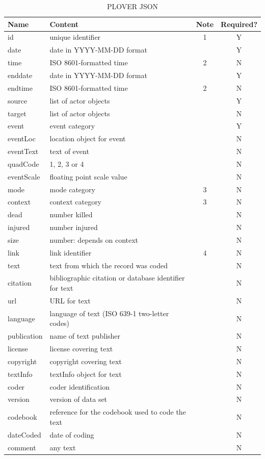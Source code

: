 \documentclass[11pt]{report}
\begin{document}
\begin{table}[htp]
\caption{PLOVER JSON }
\begin{center}
\begin{tabular}{|l|l|c|c|}
\hline
Name & Content & Note & Required? \\
\hline
id & unique identifier & 1 & Y\\
date & date in YYYY-MM-DD format &  & Y\\
time & ISO 8601-formatted time & 2 & N\\
enddate & date in YYYY-MM-DD format &  & Y\\
endtime & ISO 8601-formatted time & 2 & N\\
source & list of actor objects & & Y \\
target & list of actor objects & & N \\
event & event category & & Y \\
eventLoc & location object for event & & N \\
eventText & text of event & & N \\
quadCode & 1, 2, 3 or 4 & & N \\
eventScale & floating point scale value & & N \\
mode & mode category & 3 & N \\
context & context category & 3 & N \\
dead & number killed & & N \\
injured & number injured   & & N \\
size & number: depends on context  & & N \\
link &  link identifier & 4 & N \\
text & text from which the record was coded & & N \\
citation &  bibliographic citation or database identifier for text & & N \\
url &  URL for text & & N \\
language & language of text (ISO 639-1 two-letter codes) & & N \\
publication & name of text publisher& & N \\
license & license covering text& & N \\
copyright & copyright covering text& & N \\
textInfo & textInfo object for text & & N \\
coder &  coder identification & & N \\
version &  version of data set & & N \\
codebook &  reference for the codebook used to code the text & & N \\
dateCoded & date of coding & & N \\
comment &  any text & & N \\

\hline

\end{tabular}
\end{center}
\label{tab:json}
\end{table}
\end{document}
